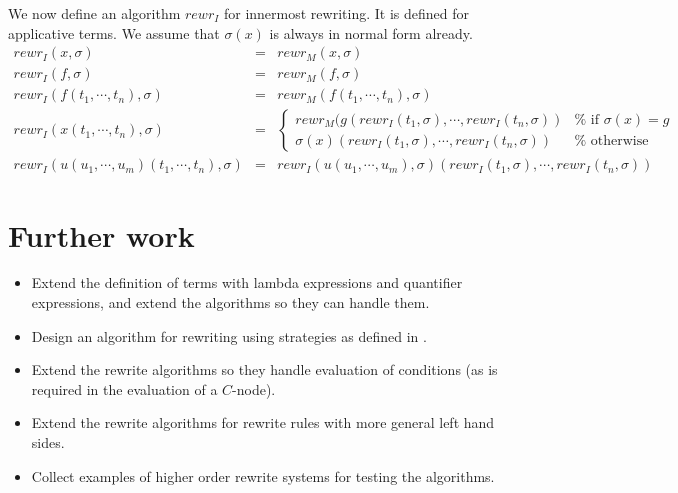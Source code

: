 \documentclass{article}
\begin{document}
We now define an algorithm $rewr_{I}$ for innermost rewriting. It is defined
for applicative terms. We assume that $\sigma (x)$ is always in normal form
already.%
\begin{equation*}
\begin{array}{lll}
rewr_{I}(x,\sigma ) & = & rewr_{M}(x,\sigma ) \\ 
rewr_{I}(f,\sigma ) & = & rewr_{M}(f,\sigma ) \\ 
rewr_{I}(f(t_{1},\cdots ,t_{n}),\sigma ) & = & rewr_{M}(f(t_{1},\cdots
,t_{n}),\sigma ) \\ 
rewr_{I}(x(t_{1},\cdots ,t_{n}),\sigma ) & = & \left\{ 
\begin{array}{ll}
rewr_{M}(g(rewr_{I}(t_{1},\sigma ),\cdots ,rewr_{I}(t_{n},\sigma )) & \text{%
if }\sigma (x)=g \\ 
\sigma (x)(rewr_{I}(t_{1},\sigma ),\cdots ,rewr_{I}(t_{n},\sigma )) & \text{%
otherwise}%
\end{array}%
\right.  \\ 
rewr_{I}(u(u_{1},\cdots ,u_{m})(t_{1},\cdots ,t_{n}),\sigma ) & = & 
rewr_{I}(u(u_{1},\cdots ,u_{m}),\sigma )(rewr_{I}(t_{1},\sigma ),\cdots
,rewr_{I}(t_{n},\sigma ))%
\end{array}%
\end{equation*}

\section{Further work}

\begin{itemize}
\item Extend the definition of terms with lambda expressions and quantifier
expressions, and extend the algorithms so they can handle them.

\item Design an algorithm for rewriting using strategies as defined in \cite%
{weerdenburg2009}.

\item Extend the rewrite algorithms so they handle evaluation of conditions
(as is required in the evaluation of a $C$-node).

\item Extend the rewrite algorithms for rewrite rules with more general left
hand sides.

\item Collect examples of higher order rewrite systems for testing the
algorithms.
\end{itemize}



\end{document}
